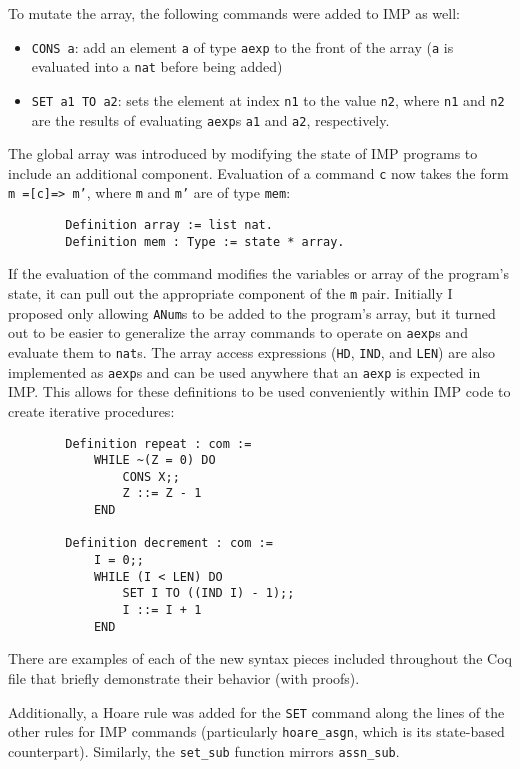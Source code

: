 \documentclass{article}
\begin{document}
    To mutate the array, the following commands were added to IMP as well:
    \begin{itemize}
        \item \texttt{CONS a}: add an element \texttt{a} of type \texttt{aexp} to the front of the array (\texttt{a} is evaluated into a \texttt{nat} before being added)
        \item \texttt{SET a1 TO a2}: sets the element at index \texttt{n1} to the value \texttt{n2}, where \texttt{n1} and \texttt{n2} are the results of evaluating \texttt{aexp}s \texttt{a1} and \texttt{a2}, respectively.
    \end{itemize}
    
    The global array was introduced by modifying the state of IMP programs to include an additional component. Evaluation of a command \texttt{c} now takes the form \texttt{m =[c]=> m'}, where \texttt{m} and \texttt{m'} are of type \texttt{mem}:
    \begin{lstlisting}
        Definition array := list nat.
        Definition mem : Type := state * array.
    \end{lstlisting}
    
    If the evaluation of the command modifies the variables or array of the program's state, it can pull out the appropriate component of the \texttt{m} pair. Initially I proposed only allowing \texttt{ANum}s to be added to the program's array, but it turned out to be easier to generalize the array commands to operate on \texttt{aexp}s and evaluate them to \texttt{nat}s. The array access expressions (\texttt{HD}, \texttt{IND}, and \texttt{LEN}) are also implemented as \texttt{aexp}s and can be used anywhere that an \texttt{aexp} is expected in IMP. This allows for these definitions to be used conveniently within IMP code to create iterative procedures:
    \begin{lstlisting}
        Definition repeat : com :=
            WHILE ~(Z = 0) DO
                CONS X;;
                Z ::= Z - 1
            END

        Definition decrement : com :=
            I = 0;;
            WHILE (I < LEN) DO
                SET I TO ((IND I) - 1);;
                I ::= I + 1
            END
    \end{lstlisting}

    There are examples of each of the new syntax pieces included throughout the Coq file that briefly demonstrate their behavior (with proofs).

    Additionally, a Hoare rule was added for the \texttt{SET} command along the lines of the other rules for IMP commands (particularly \texttt{hoare\_asgn}, which is its state-based counterpart). Similarly, the \texttt{set\_sub} function mirrors \texttt{assn\_sub}.
\end{document}
